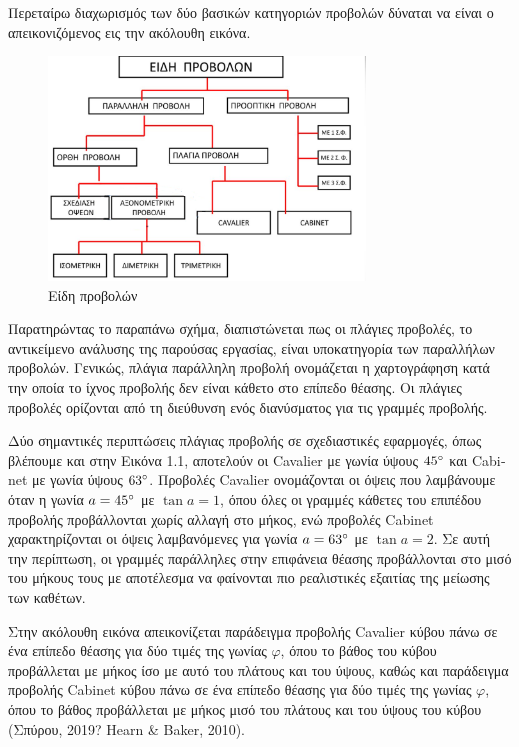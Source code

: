 Περεταίρω διαχωρισμός των δύο βασικών κατηγοριών προβολών δύναται να είναι ο απεικονιζόμενος εις την ακόλουθη εικόνα. \par

\begin{figure}[h]
\centering
\includegraphics[width=0.75\textwidth]{images/projection}
\caption{Είδη προβολών}
\end{figure}

\hspace{0.5em}

Παρατηρώντας το παραπάνω σχήμα, διαπιστώνεται πως οι πλάγιες προβολές, το αντικείμενο ανάλυσης της παρούσας εργασίας, είναι υποκατηγορία των παραλλήλων προβολών. Γενικώς, πλάγια παράλληλη προβολή ονομάζεται η χαρτογράφηση κατά την οποία το ίχνος προβολής δεν είναι κάθετο στο επίπεδο θέασης. Οι πλάγιες προβολές ορίζονται από τη διεύθυνση ενός διανύσματος για τις γραμμές προβολής. \par

Δύο σημαντικές περιπτώσεις πλάγιας προβολής σε σχεδιαστικές εφαρμογές, όπως βλέπουμε και στην Eικόνα 1.1, αποτελούν οι \textlatin{Cavalier} με γωνία ύψους $45\degree$ και \textlatin{Cabinet} με γωνία ύψους $63\degree$. Προβολές \textlatin{Cavalier} ονομάζονται οι όψεις που λαμβάνουμε όταν η γωνία $a = 45\degree$ με $\tan a = 1$, όπου όλες οι γραμμές κάθετες του επιπέδου προβολής προβάλλονται χωρίς αλλαγή στο μήκος, ενώ προβολές \textlatin{Cabinet} χαρακτηρίζονται οι όψεις λαμβανόμενες για γωνία  $a = 63\degree$ με $\tan a = 2$. Σε αυτή την περίπτωση, οι γραμμές παράλληλες στην επιφάνεια θέασης προβάλλονται στο μισό του μήκους τους με αποτέλεσμα να φαίνονται πιο ρεαλιστικές εξαιτίας της μείωσης των καθέτων. \par

Στην ακόλουθη εικόνα απεικονίζεται παράδειγμα προβολής \textlatin{Cavalier} κύβου πάνω σε ένα επίπεδο θέασης για δύο τιμές της γωνίας $φ$, όπου το βάθος του κύβου προβάλλεται με μήκος ίσο με αυτό του πλάτους και του ύψους, καθώς και παράδειγμα προβολής \textlatin{Cabinet} κύβου πάνω σε ένα επίπεδο θέασης για δύο τιμές της γωνίας $φ$, όπου το βάθος προβάλλεται με μήκος μισό του πλάτους και του ύψους του κύβου (Σπύρου, 2019? \textlatin{Hearn \& Baker}, 2010). \par

